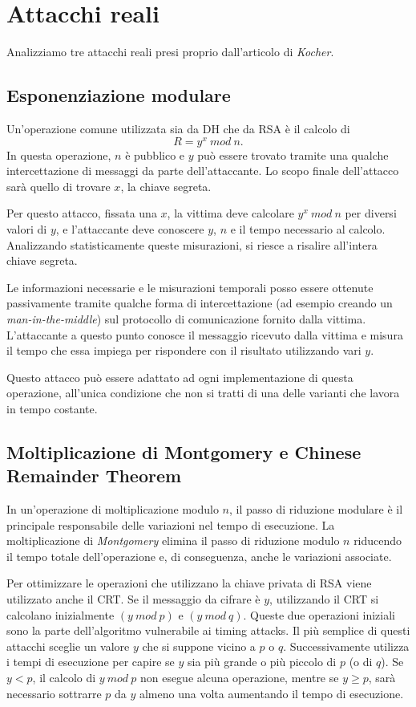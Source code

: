 	\section{Attacchi reali}
	
	Analizziamo tre attacchi reali presi proprio dall'articolo di \emph{Kocher}.
	
		\subsection{Esponenziazione modulare}
		Un'operazione comune utilizzata sia da \ac{DH} che da RSA è il calcolo di $$R = y^{x} \ mod \ n.$$ In questa operazione, $n$ è pubblico e $y$ può essere trovato tramite una qualche intercettazione di messaggi da parte dell'attaccante. Lo scopo finale dell'attacco sarà quello di trovare $x$, la chiave segreta.
		
		Per questo attacco, fissata una $x$, la vittima deve calcolare $y^{x} \ mod \ n$ per diversi valori di $y$, e l'attaccante deve conoscere $y$, $n$ e il tempo necessario al calcolo.
		Analizzando statisticamente queste misurazioni, si riesce a risalire all'intera chiave segreta.
		
		Le informazioni necessarie e le misurazioni temporali posso essere ottenute passivamente tramite qualche forma di intercettazione (ad esempio creando un \emph{man-in-the-middle}) sul protocollo di comunicazione fornito dalla vittima. L'attaccante a questo punto conosce il messaggio ricevuto dalla vittima e misura il tempo che essa impiega per rispondere con il risultato utilizzando vari $y$.
		
		Questo attacco può essere adattato ad ogni implementazione di questa operazione, all'unica condizione che non si tratti di una delle varianti che lavora in tempo costante.
		
		\subsection{Moltiplicazione di Montgomery e Chinese Remainder Theorem}
		In un'operazione di moltiplicazione modulo $n$, il passo di riduzione modulare è il principale responsabile delle variazioni nel tempo di esecuzione. La moltiplicazione di \emph{Montgomery}\cite{montgomery1985modular} elimina il passo di riduzione modulo $n$ riducendo il tempo totale dell'operazione e, di conseguenza, anche le variazioni associate.
		
		Per ottimizzare le operazioni che utilizzano la chiave privata di RSA viene utilizzato anche il \ac{CRT}. Se il messaggio da cifrare è $y$, utilizzando il \ac{CRT} si calcolano inizialmente $(y \ mod \ p)$ e $(y \ mod \ q)$. Queste due operazioni iniziali sono la parte dell'algoritmo vulnerabile ai timing attacks. Il più semplice di questi attacchi sceglie un valore $y$ che si suppone vicino a $p$ o $q$. Successivamente utilizza i tempi di esecuzione per capire se $y$ sia più grande o più piccolo di $p$ (o di $q$). Se $y < p$, il calcolo di $y \ mod \ p$ non esegue alcuna operazione, mentre se $y \geq p$, sarà necessario sottrarre $p$ da $y$ almeno una volta aumentando il tempo di esecuzione.
		
